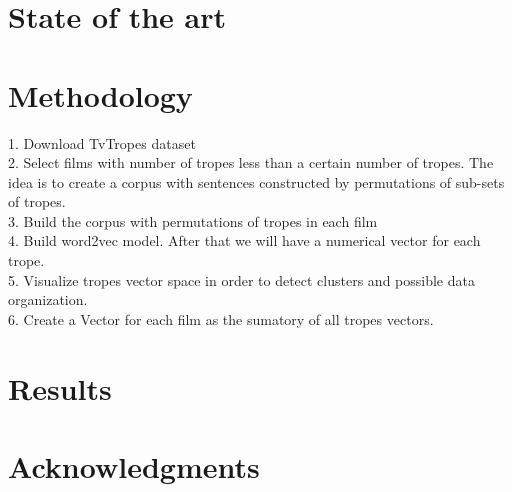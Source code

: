 \documentclass[letterpaper]{article}
\begin{document}
   









\section{State of the art}


\section{Methodology}
\label{sec:met}

1. Download TvTropes dataset \\
2. Select films with number of tropes less than a certain number of tropes. The idea is to create a corpus with sentences constructed by permutations of sub-sets of tropes. \\
3. Build the corpus with permutations of tropes in each film \\
4. Build word2vec model. After that we will have a numerical vector for each trope. \\
5. Visualize tropes vector space in order to detect clusters and possible data organization. \\ 
6. Create a Vector for each film as the sumatory of all tropes vectors. \\

\section{Results} 


\section{Acknowledgments}




\end{document}
